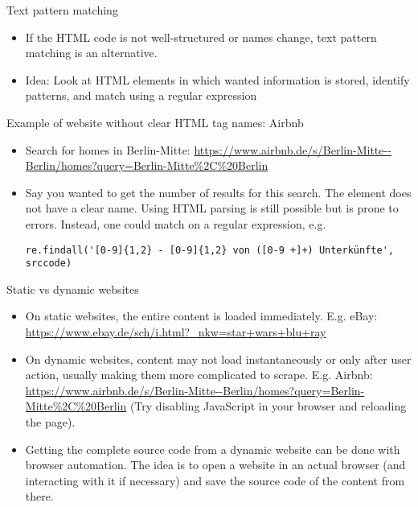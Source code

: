 \begin{frame}{Text pattern matching}
\begin{itemize}
	\item If the HTML code is not well-structured or names change, text pattern matching is an alternative.
	\item Idea: Look at HTML elements in which wanted information is stored, identify patterns, and match using a regular expression
\end{itemize}
\end{frame}

\begin{frame}[fragile]{Example of website without clear HTML tag names: Airbnb}
\begin{itemize}
	\item Search for homes in Berlin-Mitte: \url{https://www.airbnb.de/s/Berlin-Mitte--Berlin/homes?query=Berlin-Mitte\%2C\%20Berlin}
	\item Say you wanted to get the number of results for this search. The element does not have a clear name. Using HTML parsing is still possible but is prone to errors. Instead, one could match on a regular expression, e.g.
\begin{verbatim}
re.findall('[0-9]{1,2} - [0-9]{1,2} von ([0-9 +]+) Unterkünfte', srccode)
\end{verbatim}
\end{itemize}
\end{frame}

\begin{frame}{Static vs dynamic websites}
\begin{itemize}
	\item On static websites, the entire content is loaded immediately. E.g. eBay: \url{https://www.ebay.de/sch/i.html?_nkw=star+wars+blu+ray}
	\item On dynamic websites, content may not load instantaneously or only after user action, usually making them more complicated to scrape. E.g. Airbnb: \url{https://www.airbnb.de/s/Berlin-Mitte--Berlin/homes?query=Berlin-Mitte\%2C\%20Berlin} (Try disabling JavaScript in your browser and reloading the page).
	\item Getting the complete source code from a dynamic website can be done with browser automation. The idea is to open a website in an actual browser (and interacting with it if necessary) and save the source code of the content from there.
\end{itemize}
\end{frame}

